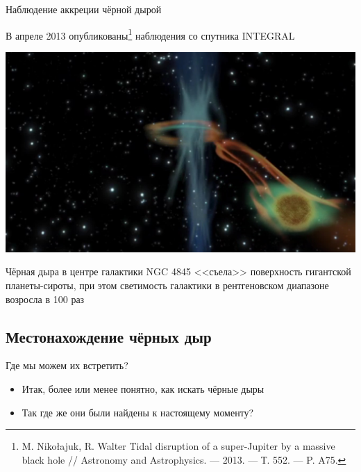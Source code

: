 \documentclass[usenames,dvipsnames,pdftex,unicode,hidelinks]{beamer}
\begin{document}
  \begin{frame}{Наблюдение аккреции чёрной дырой}

    {
      \small
      В апреле 2013 опубликованы\footnote{M. Niko\l ajuk, R. Walter Tidal disruption of a super-Jupiter by a massive black hole // Astronomy and Astrophysics. — 2013. — Т. 552. — P. A75.}
      наблюдения со спутника INTEGRAL
      \begin{center}
        \includegraphics[height=0.4\textheight]{accretion}
      \end{center}
      Чёрная дыра в центре галактики NGC 4845 <<съела>> поверхность гигантской планеты-сироты,
      при этом светимость галактики в рентгеновском диапазоне возросла в 100 раз
    }
  \end{frame}

  \subsection{Местонахождение чёрных дыр}

  \begin{frame}{Где мы можем их встретить?}
    \begin{itemize}
      \item Итак, более или менее понятно, \alert{как} искать чёрные дыры
        \vspace{1cm}
      \item Так \alert{где} же они были найдены к настоящему моменту?
    \end{itemize}
  \end{frame}
\end{document}
